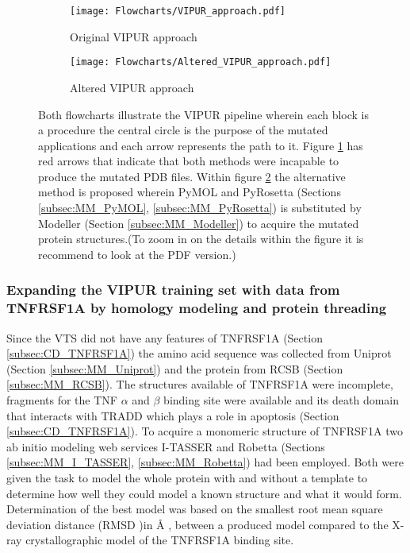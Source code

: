 	\begin{figure}[!ht]
		\centering
		\begin{subfigure}{0.45\textwidth}
			\texttt{[image: Flowcharts/VIPUR\_approach.pdf]}
			\caption{Original VIPUR approach}
			\label{fig:RES_VIPUR_approach}
		\end{subfigure}
		\begin{subfigure}{0.45\textwidth}
			\texttt{[image: Flowcharts/Altered\_VIPUR\_approach.pdf]}
			\caption{Altered VIPUR approach}
			\label{fig:RES_Altered_VIPUR_approach}
		\end{subfigure}
		\caption[Flowcharts VIPUR pipeline and altered VIPUR pipeline]{Both flowcharts illustrate the VIPUR pipeline wherein each block is a procedure the central circle is the purpose of the mutated applications and each arrow represents the path to it. Figure \ref{fig:RES_VIPUR_approach} has red arrows that indicate that both methods were incapable to produce the mutated PDB files. Within figure \ref{fig:RES_Altered_VIPUR_approach} the alternative method is proposed wherein PyMOL and PyRosetta (Sections \ref{subsec:MM_PyMOL}, \ref{subsec:MM_PyRosetta}) is substituted by Modeller (Section \ref{subsec:MM_Modeller}) to acquire the mutated protein structures.(To zoom in on the details within the figure it is recommend to look at the PDF version.)}

		\label{fig:Flowcharts_of_old_and_altered_VIPUR}
	\end{figure}
	\label{subsubsec:RES_Incompatibility}
	\newpage
	
	\subsubsection{Expanding the VIPUR training set with data from TNFRSF1A by homology modeling and protein threading}
	Since the VTS did not have any features of TNFRSF1A (Section \ref{subsec:CD_TNFRSF1A}) the amino acid sequence was collected from Uniprot (Section \ref{subsec:MM_Uniprot}) and the protein from RCSB (Section \ref{subsec:MM_RCSB}). The structures available of TNFRSF1A were incomplete, fragments for the TNF $\alpha$ and $\beta$ binding site \cite{banner_crystal_1993} were available and its death domain that interacts with TRADD \cite{sukits_solution_2001} which plays a role in apoptosis (Section \ref{subsec:CD_TNFRSF1A}). To acquire a monomeric structure of TNFRSF1A two ab initio modeling web services I-TASSER and Robetta (Sections \ref{subsec:MM_I_TASSER}, \ref{subsec:MM_Robetta}) had been employed. Both were given the task to model the whole protein with and without a template to determine how well they could model a known structure and what it would form. Determination of the best model was based on the smallest root mean square deviation distance (RMSD )in {\AA} , between a produced model compared to the X-ray crystallographic model of the TNFRSF1A binding site.
	
